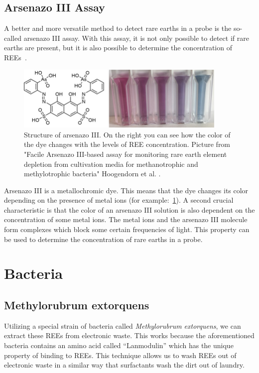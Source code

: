 \subsection{Arsenazo III Assay}
A better and more versatile method to detect rare earths in a probe is the so-called arsenazo III assay.
With this assay, it is not only possible to detect if rare earths are present, but it is also possible to determine the concentration of REEs~\cite{arsenazo3assay}.

\begin{figure}[H]
    \centering
    \includegraphics[width=0.9\textwidth]{media/images/arsenazo3_structure_example}
    \caption{Structure of arsenazo III. On the right you can see how the color of the dye changes with the levels of REE concentration. Picture from "Facile Arsenazo III-based assay for monitoring rare earth element depletion from cultivation media for methanotrophic and methylotrophic bacteria" Hoogendorn et al. \cite{arsenazo3assay}.}
    \label{fig:arsenazo3}
\end{figure}

Arsenazo III is a metallochromic dye.
This means that the dye changes its color depending on the presence of metal ions (for example:~\ref{fig:arsenazo3}).
A second crucial characteristic is that the color of an arsenazo III solution is also dependent on the concentration of some metal ions.
The metal ions and the arsenazo III molecule form complexes which block some certain frequencies of light.
This property can be used to determine the concentration of rare earths in a probe.

\newpage

\section{Bacteria}

\subsection{Methylorubrum extorquens\authorB{}}

Utilizing a special strain of bacteria called \emph{Methylorubrum extorquens}, we can extract
these REEs from electronic waste. This works because the aforementioned bacteria
contains an amino acid called “Lanmodulin” which has the unique property of binding to
REEs. This technique allows us to wash REEs out of electronic waste in a similar way that
surfactants wash the dirt out of laundry.

